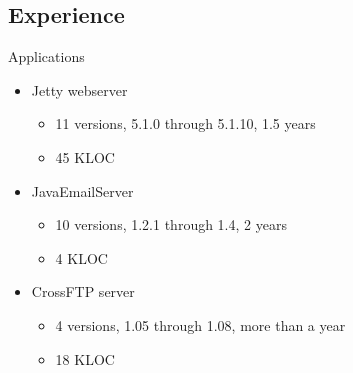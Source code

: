 
\subsection{Experience}
\ShowTOC

\newcommand{\HighlightRow}{\rowcolor{structure.fg!30}}

\begin{frame}{Applications}%
\begin{itemize}
\item Jetty webserver
  \begin{itemize}
  \item 11 versions, 5.1.0 through 5.1.10, 1.5 years
  \item 45 KLOC
  \end{itemize}
\item JavaEmailServer
  \begin{itemize}
  \item 10 versions, 1.2.1 through 1.4, 2 years
  \item 4 KLOC
  \end{itemize}
\item CrossFTP server
  \begin{itemize}
  \item 4 versions, 1.05 through 1.08, more than a year
  \item 18 KLOC
  \end{itemize}
\end{itemize}
\end{frame}


